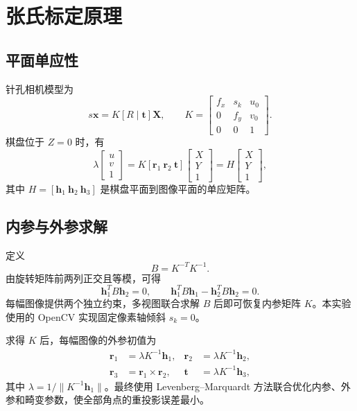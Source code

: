 \documentclass[UTF8,a4paper,12pt]{ctexart}
\begin{document}
\section{张氏标定原理}

\subsection{平面单应性}

针孔相机模型为
\begin{equation}
  s\bm x=K[R\mid\bm t]\bm X,
  \qquad
  K=\begin{bmatrix}
  f_x&s_k&u_0\\
  0&f_y&v_0\\
  0&0&1
  \end{bmatrix}.
\end{equation}
棋盘位于 $Z=0$ 时，有
\begin{equation}
  \lambda\begin{bmatrix}u\\v\\1\end{bmatrix}
  =K[\bm r_1\ \bm r_2\ \bm t]
  \begin{bmatrix}X\\Y\\1\end{bmatrix}
  =H\begin{bmatrix}X\\Y\\1\end{bmatrix},
\end{equation}
其中 $H=[\bm h_1\ \bm h_2\ \bm h_3]$ 是棋盘平面到图像平面的单应矩阵。

\subsection{内参与外参求解}

定义
\begin{equation}
  B=K^{-T}K^{-1}.
\end{equation}
由旋转矩阵前两列正交且等模，可得
\begin{equation}
  \bm h_1^TB\bm h_2=0,
  \qquad
  \bm h_1^TB\bm h_1-\bm h_2^TB\bm h_2=0.
\end{equation}
每幅图像提供两个独立约束，多视图联合求解 $B$ 后即可恢复内参矩阵 $K$。本实验使用的 OpenCV 实现固定像素轴倾斜 $s_k=0$。

求得 $K$ 后，每幅图像的外参初值为
\begin{align}
  \bm r_1&=\lambda K^{-1}\bm h_1,&
  \bm r_2&=\lambda K^{-1}\bm h_2,\\
  \bm r_3&=\bm r_1\times\bm r_2,&
  \bm t&=\lambda K^{-1}\bm h_3,
\end{align}
其中 $\lambda=1/\lVert K^{-1}\bm h_1\rVert$。最终使用 Levenberg--Marquardt 方法联合优化内参、外参和畸变参数，使全部角点的重投影误差最小。
\end{document}
